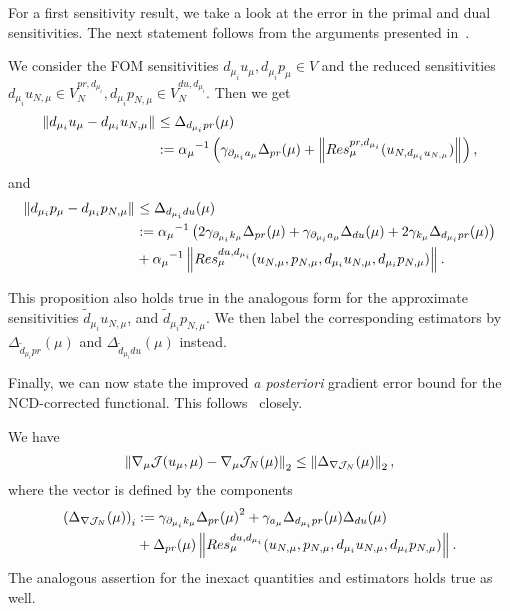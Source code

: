 For a first sensitivity result, we take a look at the error in the primal and dual sensitivities.
The next statement follows from the arguments presented in~\cite[Proposition 3.12, and Proposition 3.13]{Keil2021}.
\begin{proposition}\label{PrDualSensErrProp}
    We consider the FOM sensitivities $d_{\mu_i} u_\mu, d_{\mu_i} p_\mu \in V$ and the reduced sensitivities $d_{\mu_i} u_{N, \mu} \in V_N^{pr, d_{\mu_i}}, d_{\mu_i} p_{N, \mu} \in V_N^{du, d_{\mu_i}}$. Then we get
    \begin{align*}
        \norm{d_{\mu_i} u_\mu - d_{\mu_i} u_{N, \mu}} &\leq \Delta_{d_{\mu_i} pr}(\mu) \\
        &:= {\alpha_\mu}^{-1} \left( \gamma_{\partial_{\mu_i} a_\mu} \Delta_{pr}(\mu) + \norm{Res_\mu^{pr, d_{\mu_i}}(u_{N, d_{\mu_i} u_{N, \mu}})} \right),
    \end{align*}
    and
    \begin{align*}
        \norm{d_{\mu_i} p_\mu - d_{\mu_i} p_{N, \mu}} &\leq \Delta_{d_{\mu_i} du}(\mu) \\
        &:= {\alpha_\mu}^{-1} \left( 2 \gamma_{\partial_{\mu_i} k_\mu} \Delta_{pr}(\mu) + \gamma_{\partial_{\mu_i} a_\mu} \Delta_{du}(\mu) + 2 \gamma_{k_\mu} \Delta_{d_{\mu_i} pr}(\mu) \right) \\
        &+ {\alpha_\mu}^{-1} \norm{Res_\mu^{du, d_{\mu_i}}(u_{N, \mu}, p_{N, \mu}, d_{\mu_i} u_{N, \mu}, d_{\mu_i} p_{N, \mu})}.
    \end{align*}
\end{proposition}
This proposition also holds true in the analogous form for the approximate sensitivities $\tilde{d}_{\mu_i} u_{N, \mu}$, and $\tilde{d}_{\mu_i} p_{N, \mu}$.
We then label the corresponding estimators by $\Delta_{\tilde{d}_{\mu_i} pr}(\mu)$ and $\Delta_{\tilde{d}_{\mu_i} du}(\mu)$ instead.

Finally, we can now state the improved \textit{a posteriori} gradient error bound for the NCD-corrected functional.
This follows~\cite[Proposition 3.14]{Keil2021} closely.
\begin{proposition}\label{GoodNCDGradientProp}
    We have
    \begin{align*}
        \norm[2]{\nabla_\mu \mathcal{J}(u_\mu, \mu) - \nabla_\mu \mathcal{J}_N(\mu)} \leq \norm[2]{\Delta_{\nabla \mathcal{J}_N}(\mu)},
    \end{align*}
    where the vector is defined by the components
    \begin{align*}
        {\left( \Delta_{\nabla \mathcal{J}_N}(\mu) \right)}_i &:= \gamma_{\partial_{\mu_i} k_\mu} {\Delta_{pr}(\mu)}^2 + \gamma_{a_\mu} \Delta_{d_{\mu_i} pr}(\mu) \Delta_{du}(\mu) \\
        &+ \Delta_{pr}(\mu) \norm{Res_\mu^{du, d_{\mu_i}}(u_{N, \mu}, p_{N, \mu}, d_{\mu_i} u_{N, \mu}, d_{\mu_i} p_{N, \mu})}.
    \end{align*}
    The analogous assertion for the inexact quantities and estimators holds true as well.
\end{proposition}

